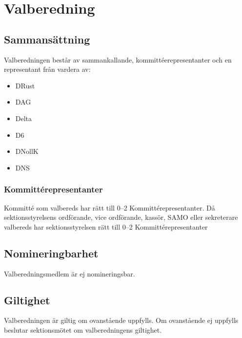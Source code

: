 \section{Valberedning}
\subsection{Sammansättning}
Valberedningen består av sammankallande, kommittéerepresentanter och en representant från vardera av:
\begin{itemize}
  \item DRust
  \item DAG 
  \item Delta 
  \item D6 
  \item DNollK
  \item DNS
\end{itemize}

\subsubsection{Kommittérepresentanter}
  Kommitté som valbereds har rätt till 0--2 Kommittérepresentanter. Då sektionsstyrelsens ordförande, vice ordförande, kassör, SAMO eller sekreterare valbereds har sektionsstyrelsen rätt till 0--2 Kommittérepresentanter 

\subsection{Nomineringbarhet}
Valberedningsmedlem är ej nomineringsbar.

\subsection{Giltighet}
Valberedningen är giltig om ovanstående uppfylls. Om ovanstående ej uppfylls beslutar sektionsmötet om valberedningens giltighet.

